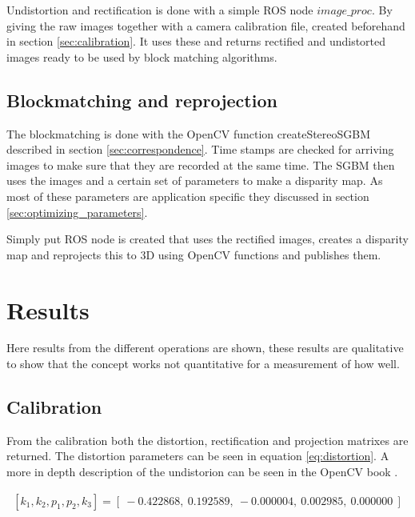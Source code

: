 Undistortion and rectification is done with a simple ROS node $image\_proc$. By giving the raw images together with a camera calibration file, created beforehand in section \ref{sec:calibration}. It uses these and returns rectified and undistorted images ready to be used by block matching algorithms.

\subsection{Blockmatching and reprojection}

The blockmatching is done with the OpenCV function createStereoSGBM \cite{opencv} described in section \ref{sec:correspondence}. Time stamps are checked for arriving images to make sure that they are recorded at the same time. The SGBM then uses the images and a certain set of parameters to make a disparity map. As most of these parameters are application specific they discussed in section \ref{sec:optimizing_parameters}. 


Simply put ROS node is created that uses the rectified images, creates a disparity map and reprojects this to 3D using OpenCV functions and publishes them.
 
\section{Results}

Here results from the different operations are shown, these results are qualitative to show that the concept works not quantitative for a measurement of how well.

\subsection{Calibration}

From the calibration both the distortion, rectification and projection matrixes are returned. The distortion parameters can be seen in equation \ref{eq:distortion}. A more in depth description of the undistorion can be seen in the OpenCV book \cite{locv}.



\begin{equation}\label{eq:distortion}
\begin{split}
[ k_{1}, k_{2}, p_{1}, p_{2}, k_{3} ] = [\ -0.422868,\ 0.192589,\ -0.000004,\ 0.002985,\ 0.000000\ ]
\end{split}
\end{equation} 

